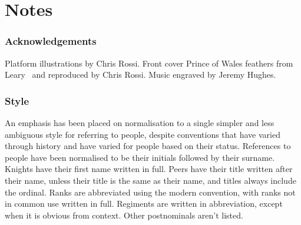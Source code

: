 \part{Notes}

\section*{Acknowledgements}

Platform illustrations by Chris Rossi. Front cover Prince of Wales feathers from Leary~\cite{leary} and reproduced by Chris Rossi. Music engraved by Jeremy Hughes.

\section*{Style}

An emphasis has been placed on normalisation to a single simpler and less ambiguous style for referring to people, despite conventions that have varied through history and have varied for people based on their status. References to people have been normalised to be their initials followed by their surname. Knights have their first name written in full. Peers have their title written after their name, unless their title is the same as their name, and titles always include the ordinal. Ranks are abbreviated using the modern convention, with ranks not in common use written in full. Regiments are written in abbreviation, except when it is obvious from context. Other postnominals aren't listed.
